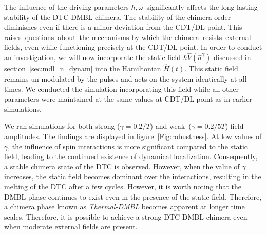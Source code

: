 \documentclass[12pt]{iopart}
\begin{document}
The influence of the driving parameters $h, \omega$ significantly affects the long-lasting stability of the DTC-DMBL chimera. The stability of the chimera order diminishes even if there is a minor deviation from the CDT/DL point. This raises questions about the mechanisms by which the chimera resists external fields, even while functioning precisely at the CDT/DL point.
In order to conduct an investigation, we will now incorporate the static field $\hbar\hat{V}(\hat{\sigma}^{\gamma})$ discussed in section~\ref{sec:mdl_n_dynam} into the Hamiltonian $\hat{H}(t)$. This static field remains un-modulated by the pulses and acts on the system identically at all times. We conducted the simulation incorporating this field while all other parameters were maintained at the same values at CDT/DL point as in earlier simulations. 

We ran simulations for both strong ($\gamma=0.2/T$) and weak ($ \gamma= 0.2/5T$) field amplitudes. The findings are displayed in figure~\ref{Fig:robustness}. At low values of $\gamma$, the influence of spin interactions is more significant compared to the static field, leading to the continued existence of dynamical localization. Consequently, a stable chimera state of the DTC is observed. However, when the value of $\gamma$ increases, the static field becomes dominant over the interactions, resulting in the melting of the DTC after a few cycles. However, it is worth noting that the DMBL phase continues to exist even in the presence of the static field. Therefore, a chimera phase known as \textit{Thermal-DMBL} becomes apparent at longer time scales. Therefore, it is possible to achieve a strong DTC-DMBL chimera even when moderate external fields are present.
	
\end{document}
